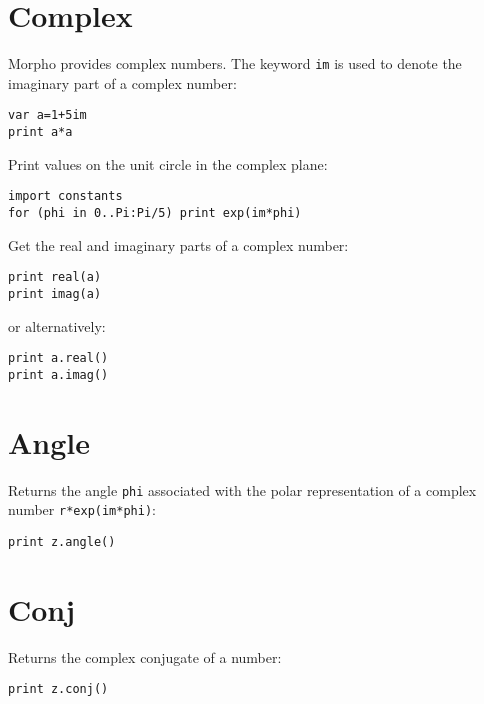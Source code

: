 \hypertarget{complex}{%
\section{Complex}\label{complex}}

Morpho provides complex numbers. The keyword \texttt{im} is used to
denote the imaginary part of a complex number:

\begin{lstlisting}
var a=1+5im 
print a*a
\end{lstlisting}

Print values on the unit circle in the complex plane:

\begin{lstlisting}
import constants 
for (phi in 0..Pi:Pi/5) print exp(im*phi)
\end{lstlisting}

Get the real and imaginary parts of a complex number:

\begin{lstlisting}
print real(a) 
print imag(a) 
\end{lstlisting}

or alternatively:

\begin{lstlisting}
print a.real()
print a.imag() 
\end{lstlisting}

\hypertarget{angle}{%
\section{Angle}\label{angle}}

Returns the angle \texttt{phi} associated with the polar representation
of a complex number \texttt{r*exp(im*phi)}:

\begin{lstlisting}
print z.angle() 
\end{lstlisting}

\hypertarget{conj}{%
\section{Conj}\label{conj}}

Returns the complex conjugate of a number:

\begin{lstlisting}
print z.conj() 
\end{lstlisting}
